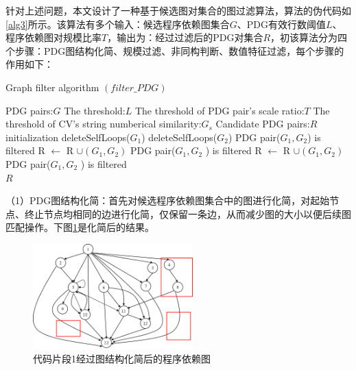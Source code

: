 针对上述问题，本文设计了一种基于候选图对集合的图过滤算法，算法的伪代码如\ref{alg3}所示。该算法有多个输入：候选程序依赖图集合$G$、PDG有效行数阈值$L$、程序依赖图对规模比率$T$，输出为：经过过滤后的PDG对集合$R$，初该算法分为四个步骤：PDG图结构化简、规模过滤、非同构判断、数值特征过滤，每个步骤的作用如下：

\begin{algorithm}[ht]  
	\renewcommand{\algorithmicrequire}{\textbf{Input:}}
	\renewcommand{\algorithmicensure}{\textbf{Output:}}
	\caption{Graph filter algorithm $\left(filter\_PDG\right)$}  
	\label{alg3}
	\begin{algorithmic}[1]
    \Require PDG pairs:$G$
    \Require The threshold:$L$
    \Require The threshold of PDG pair's scale ratio:$T$
    \Require The threshold of CV's string numberical similarity:$G_s$
		\Ensure Candidate PDG pairs:$R$
    \State initialization
      \State deleteSelfLoops($G_1$)
      \State deleteSelfLoops($G_2$) 
        \State PDG pair($G_1,G_2$) is filtered 
      \Else
           
            \State R $\leftarrow$ R $\cup \left(G_1,G_2\right)$ 
          \Else
            \State PDG pair($G_1,G_2$ ) is filtered
          \EndIf
        \Else
           
            \State R $\leftarrow$ R $\cup \left(G_1,G_2\right)$
          \Else
            \State PDG pair($G_1,G_2$ ) is filtered
          \EndIf
        \EndIf
      \EndIf 
    \EndFor \\
    \Return $R$
	\end{algorithmic}
\end{algorithm}

（1）PDG图结构化简：首先对候选程序依赖图集合中的图进行化简，对起始节点、终止节点均相同的边进行化简，仅保留一条边，从而减少图的大小以便后续图匹配操作。下图\ref{fig:pdgshili3}是化简后的结果。

\begin{figure}[H]
  \centering
  \includegraphics[width=0.55\textwidth]{figures/pdgshili3.png}
  \caption{代码片段1经过图结构化简后的程序依赖图}\label{fig:pdgshili3}
\end{figure}

